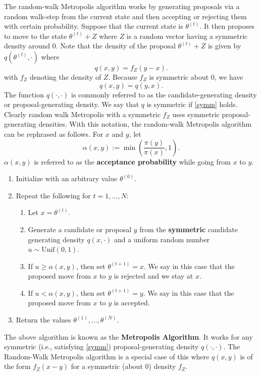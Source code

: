\documentclass{scrartcl}
\begin{document}
The random-walk Metropolis algorithm works by
generating proposals via a random walk-step from the current state and
then accepting or rejecting them with certain probability. Suppose
that the current state is $\theta^{(t)}$. It then proposes to move to
the state $\theta^{(t)} + Z$ where $Z$ is a random vector having a
symmetric density around 0. Note that the density 
of the proposal $\theta^{(t)} + Z$ is given by $q(\theta^{(t)},
\cdot)$ where 
\begin{equation*}
  q(x, y) = f_Z(y - x). 
\end{equation*}
with $f_Z$ denoting the density of $Z$. Because $f_Z$ is symmetric
about 0, we have  
\begin{equation}\label{symm}
  q(x, y) = q(y, x). 
\end{equation}
The function $q(\cdot, \cdot)$ is commonly referred to as the
candidate-generating density or proposal-generating density. We say
that $q$ is symmetric if \eqref{symm} holds. Clearly random walk
Metropolis with a symmetric $f_{Z}$ uses symmetric proposal-generating
densities. With this notation, the random-walk Metropolis algorithm can be
rephrased as follows. For $x$ and $y$, let  
\begin{equation}\label{acc.symm}
  \alpha(x, y) := \min \left(\frac{\pi(y)}{\pi(x)}, 1\right). 
\end{equation}
$\alpha(x, y)$ is referred to as the \textbf{acceptance probability}
while going from $x$ to $y$. 

\begin{enumerate}
\item Initialize with an arbitrary value $\theta^{(0)}$.
\item Repeat the following for $t = 1, \dots, N$:
  \begin{enumerate}
  \item Let $x = \theta^{(t)}$. 
  \item Generate a candidate or proposal $y$ from the
    \textbf{symmetric} candidate generating density $q(x,
    \cdot)$ and a uniform random number $u \sim \text{Unif}(0,
    1)$.
  \item If $u \geq \alpha(x, y)$, then set
    $\theta^{(t + 1)} = x$. We say in this case that the
    proposed move from $x$ to $y$ is rejected and we stay at $x$. 
  \item If $u < \alpha(x, y)$, then set
    $\theta^{(t+1)} = y$. We say in this case that the
    proposed move from $x$ to $y$ is accepted. 
  \end{enumerate}
\item Return the values $\theta^{(1)}, \dots, \theta^{(N)}$.   
\end{enumerate}
The above algorithm is known as the \textbf{Metropolis Algorithm}. It
works for any symmetric (i.e., satisfying \eqref{symm})
proposal-generating density $q(\cdot, \cdot)$. The Random-Walk
Metropolis algorithm is a special case of this where $q(x,
y)$ is of the form $f_{Z}(x - y)$ for a symmetric (about 0)
density $f_{Z}$.
\end{document}
